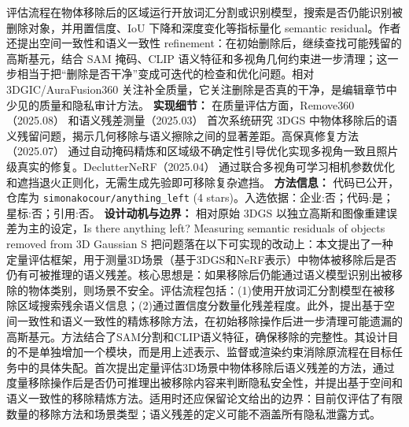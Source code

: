 评估流程在物体移除后的区域运行开放词汇分割或识别模型，搜索是否仍能识别被删除对象，并用置信度、IoU 下降和深度变化等指标量化 semantic residual。作者还提出空间一致性和语义一致性 refinement：在初始删除后，继续查找可能残留的高斯基元，结合 SAM 掩码、CLIP 语义特征和多视角几何约束进一步清理；这一步相当于把“删除是否干净”变成可迭代的检查和优化问题。相对 3DGIC/AuraFusion360 关注补全质量，它关注删除是否真的干净，是编辑章节中少见的质量和隐私审计方法。
\textbf{实现细节：} 在质量评估方面，Remove360（2025.08） 和语义残差测量（2025.03） 首次系统研究 3DGS 中物体移除后的语义残留问题，揭示几何移除与语义擦除之间的显著差距。高保真修复方法（2025.07） 通过自动掩码精炼和区域级不确定性引导优化实现多视角一致且照片级真实的修复。DeclutterNeRF（2025.04） 通过联合多视角可学习相机参数优化和遮挡退火正则化，无需生成先验即可移除复杂遮挡。
\textbf{方法信息：} 代码已公开，仓库为 \texttt{simonakocour/anything\_left} (4 stars)。入选依据：企业:否；代码:是；星标:否；引用:否。
\textbf{设计动机与边界：} 相对原始 3DGS 以独立高斯和图像重建误差为主的设定，Is there anything left? Measuring semantic residuals of objects removed from 3D Gaussian S 把问题落在以下可实现的改动上：本文提出了一种定量评估框架，用于测量3D场景（基于3DGS和NeRF表示）中物体被移除后是否仍有可被推理的语义残差。核心思想是：如果移除后仍能通过语义模型识别出被移除的物体类别，则场景不安全。评估流程包括：(1)使用开放词汇分割模型在被移除区域搜索残余语义信息；(2)通过置信度分数量化残差程度。此外，提出基于空间一致性和语义一致性的精炼移除方法，在初始移除操作后进一步清理可能遗漏的高斯基元。方法结合了SAM分割和CLIP语义特征，确保移除的完整性。其设计目的不是单独增加一个模块，而是用上述表示、监督或渲染约束消除原流程在目标任务中的具体失配。首次提出定量评估3D场景中物体移除后语义残差的方法，通过度量移除操作后是否仍可推理出被移除内容来判断隐私安全性，并提出基于空间和语义一致性的移除精炼方法。适用时还应保留论文给出的边界：目前仅评估了有限数量的移除方法和场景类型；语义残差的定义可能不涵盖所有隐私泄露方式。
